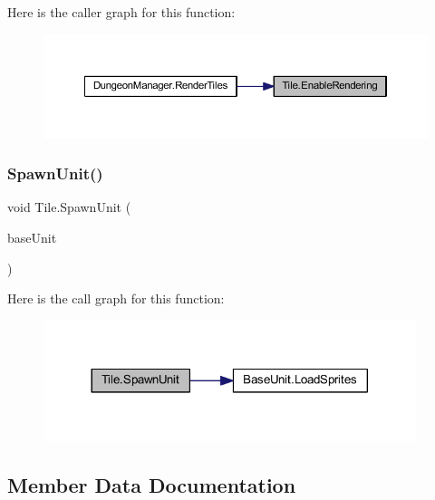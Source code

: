 Here is the caller graph for this function\+:\nopagebreak
\begin{figure}[H]
\begin{center}
\leavevmode
\includegraphics[width=350pt]{class_tile_a1baa5fe3ab8f887e8985a85fba21210a_icgraph}
\end{center}
\end{figure}
\mbox{\label{class_tile_a183188c193a2ba5b62c8cdfc6d63471d}} 
\subsubsection{\texorpdfstring{SpawnUnit()}{SpawnUnit()}}
{\footnotesize\ttfamily void Tile.\+Spawn\+Unit (\begin{DoxyParamCaption}\item[{\mbox{\hyperlink{class_base_unit}{Base\+Unit}}}]{base\+Unit }\end{DoxyParamCaption})}

Here is the call graph for this function\+:\nopagebreak
\begin{figure}[H]
\begin{center}
\leavevmode
\includegraphics[width=308pt]{class_tile_a183188c193a2ba5b62c8cdfc6d63471d_cgraph}
\end{center}
\end{figure}


\subsection{Member Data Documentation}
\mbox{\label{class_tile_a1a28313208606507b9c570a141461eab}} 
